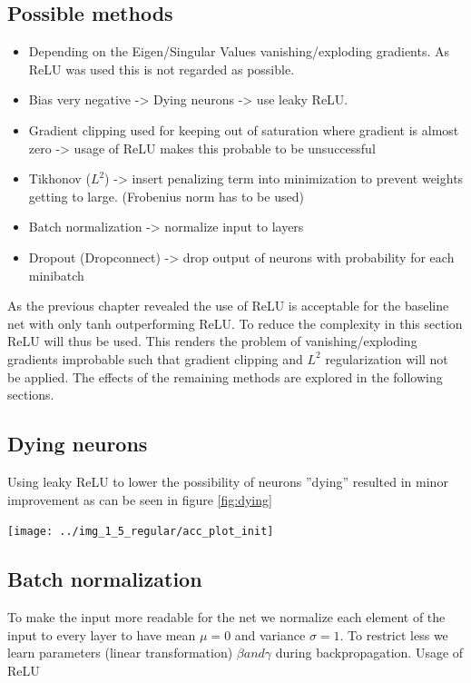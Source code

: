 \documentclass{article}
\newenvironment{Figure}
{\par\medskip\noindent\minipage{\linewidth}}
{\endminipage\par\medskip}
\begin{document}
\begin{multicols}{2}
\subsection{Possible methods}
\begin{itemize}
	\item Depending on the Eigen/Singular Values vanishing/exploding gradients. As ReLU was used this is not regarded as possible.
	\item Bias very negative -> Dying neurons -> use leaky ReLU.
	\item Gradient clipping used for keeping out of saturation where gradient is almost zero -> usage of ReLU makes this probable to be unsuccessful
	\item Tikhonov ($L^{2}$) -> insert penalizing term into minimization to prevent weights getting to large. (Frobenius norm has to be used)
	\item Batch normalization -> normalize input to layers
	\item Dropout (Dropconnect) -> drop output of neurons with probability for each minibatch
\end{itemize}
As the previous chapter revealed the use of ReLU is acceptable for the baseline net with only tanh outperforming ReLU. To reduce the complexity in this section ReLU will thus be used. This renders the problem of vanishing/exploding gradients improbable such that gradient clipping and $L^{2}$ regularization will not be applied. The effects of the remaining methods are explored in the following sections.

\subsection{Dying neurons}
Using leaky ReLU to lower the possibility of neurons ''dying'' resulted in minor improvement as can be seen in figure \ref{fig:dying}
\begin{Figure}
	\label{fig:dying}
	\centering
	\texttt{[image: ../img\_1\_5\_regular/acc\_plot\_init]}
\end{Figure}

\subsection{Batch normalization}
To make the input more readable for the net we normalize each element of the input to every layer to have mean $\mu=0$ and variance $\sigma=1$. To restrict less we learn parameters (linear transformation) $\beta and \gamma$ during backpropagation. Usage of ReLU


\end{multicols}
\end{document}

